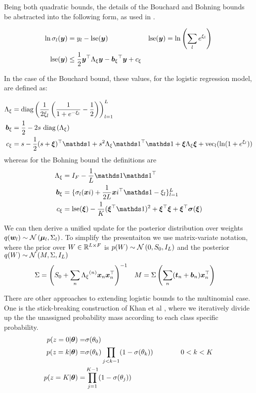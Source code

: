 Being both quadratic bounds, the details of the Bouchard and Bohning bounds be abstracted into the following form, as used in \cite{Khan2010}.

\begin{align}
\ln \sigma_l(\bm y) & = y_l - \text{lse} (\bm y) & \text{lse} (\bm y) & = \ln \left(\sum_l e^{\xi_l} \right)\\
\text{lse}(\bm y) & \leq \frac{1}{2} \bm y^\top { \Lambda_{\xi} } \bm y - { \bm b_{\xi} }^\top\bm y + { c_{\xi} }
\end{align}

In the case of the Bouchard bound, these values, for the logistic regression model, are defined as:

\begin{align}
\Axi & = \diag{\frac{1}{2\xi_l} \left( \frac{1}{1 + e^{-\xi_l}} - \half\right) }_{l=1}^L  \\
\bxi & = \half - 2 s \text{ }\diag{\Axi} \\
\cxi & = s - \half (s + \vv{\xi})\T\one + s^2\Axi \one\T\one + \vv{\xi}\Axi\vv{\xi} + \text{vec}_l(\ln (1 + e^{\xi_l}))
\end{align}
whereas for the Bohning bound the definitions are
\begin{align}
\Axi & = I_F - \frac{1}{L} \one \one \T \\
\bxi & = \{ \sigma_l(\vv{xi}) + \frac{1}{2L} \vv{xi}\T\one - \xi_l \}_{l=1}^{L} \\
\cxi & = \lse(\vv{\xi}) - \frac{1}{K}(\vv{\xi}\T\one)^2 + \vv{\xi}\T\vv{\xi} + \vv{\xi}\T\vv{\sigma}(\vv{\xi})
\end{align}

We can then derive a unified update for the posterior distribution over weights $q(\bm w_l) \sim \mathcal{N} \left( {\bm \mu_l}, {\Sigma_l} \right)$. To simplify the presentaiton we use matrix-variate notation, where the prior over $W \in { \mathbb{R}^{L \times F} }$ is $p(W) \sim \mathcal{N} \left(0, S_0, I_L\right)$ and the posterior $q(W) \sim \mathcal{N} \left(M, \Sigma, I_L\right)$
\begin{align}
\Sigma &= {\left( S_0 + \sum_n { \Lambda_{\xi} }^{(n)}\bm x_n\bm x_n^\top \right)}^{-1} & M &= \Sigma \left(\sum_n (\bm t_n + \bm b_n)\bm x_n^\top\right)
\end{align}


\newcommand \C { \mathcal{C} }

There are other approaches to extending logistic bounds to the multinomial case. One is the stick-breaking construction of Khan et al \cite{Khan2012stick}, where we iteratively divide up the the unassigned probability mass according to each class specific probability.
\begin{align}
\begin{split}
p(z = 0 | \bm \theta) = & \sigma(\theta_0) \\
p(z = k | \bm \theta) = & \sigma(\theta_k) \prod_{j < k - 1} (1 - \sigma(\theta_k)) \qquad\qquad 0 < k < K \\
p (z = K | \bm \theta) = & \prod_{j = 1}^{K - 1} (1 - \sigma(\theta_j))
\end{split}
\end{align}

